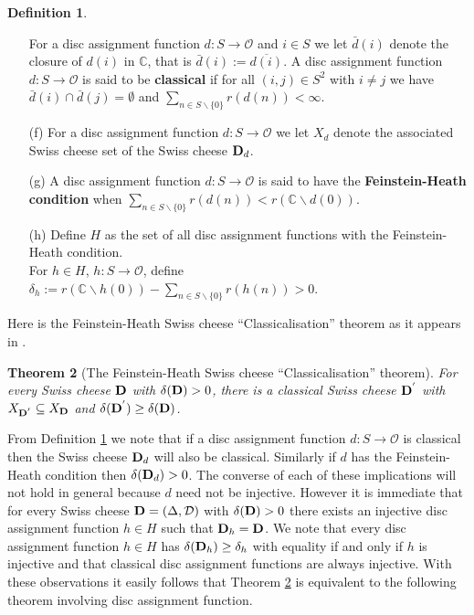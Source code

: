 \documentclass{strippedproc-l}
\newtheorem{theorem}{Theorem}[section]
\theoremstyle{definition}
\newtheorem{definition}[theorem]{Definition}
\theoremstyle{remark}
\numberwithin{equation}{section}
\begin{document}
\begin{definition}
\begin{enumerate}
For a disc assignment function $d:S\rightarrow\mathcal{O}$ and $i\in S$ we let $\bar{d}(i)$ denote the closure of $d(i)$ in $\mathbb{C}$, that is $\bar{d}(i):=\overline{d(i)}$. A disc assignment function $d:S\rightarrow\mathcal{O}$ is said to be {\bf{classical}} if for all $(i,j)\in S^{2}$ with $i\not= j$ we have $\bar{d}(i)\cap\bar{d}(j)=\emptyset$ and $\sum_{n\in S\backslash\{0\}}r(d(n))<\infty$.
\item[\textup{(f)}]
For a disc assignment function $d:S\rightarrow\mathcal{O}$ we let $X_{d}$ denote the associated Swiss cheese set of the Swiss cheese ${\bf{D}}_{d}$.
\item[\textup{(g)}]
A disc assignment function $d:S\rightarrow\mathcal{O}$ is said to have the {\bf{Feinstein-Heath condition}} when $\sum_{n\in S\backslash\{0\}}r(d(n))<r(\mathbb{C}\backslash d(0))$.
\item[\textup{(h)}]
Define $H$ as the set of all disc assignment functions with the Feinstein-Heath condition.\\
For $h\in H$, $h:S\rightarrow\mathcal{O}$, define $\delta_{h}:=r(\mathbb{C}\backslash h(0))-\sum_{n\in S\backslash\{0\}}r(h(n))>0$.
\end{enumerate}
\label{def:SC}
\end{definition}
Here is the Feinstein-Heath Swiss cheese ``Classicalisation'' theorem as it appears in \cite{Feinstein-Heath}.
\begin{theorem}[The Feinstein-Heath Swiss cheese ``Classicalisation'' theorem]
For every Swiss cheese ${\bf{D}}$ with $\delta({\bf{D}})>0$, there is a classical Swiss cheese ${\bf{D^{'}}}$ with $X_{\bf{D^{'}}}\subseteq X_{\bf{D}}$ and $\delta({\bf{D^{'}}})\ge\delta({\bf{D}})$.
\label{the:FHT}
\end{theorem}
From Definition \ref{def:SC} we note that if a disc assignment function $d:S\rightarrow\mathcal{O}$ is classical then the Swiss cheese ${\bf{D}}_{d}$ will also be classical. Similarly if $d$ has the Feinstein-Heath condition then $\delta({\bf{D}}_{d})>0$. The converse of each of these implications will not hold in general because $d$ need not be injective.  However it is immediate that for every Swiss cheese ${\bf{D}}=(\Delta,\mathcal{D})$ with $\delta({\bf{D}})>0$ there exists an injective disc assignment function $h\in H$ such that ${\bf{D}}_{h}={\bf{D}}$. We note that every disc assignment function $h\in H$ has $\delta({\bf{D}}_{h})\ge\delta_{h}$ with equality if and only if $h$ is injective and that classical disc assignment functions are always injective. With these observations it easily follows that Theorem \ref{the:FHT} is equivalent to the following theorem involving disc assignment function.
\end{document}
